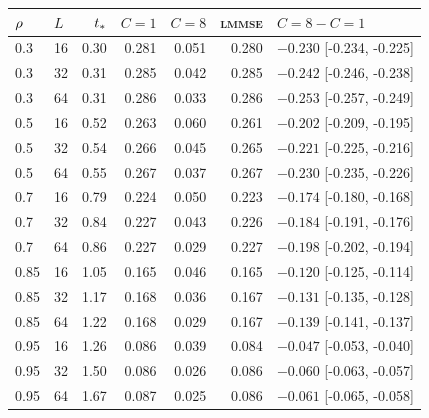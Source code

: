 \begin{tabular}{llrrrrl}
\toprule
$\rho$ & $L$ & $t_\ast$ & $C=1$ & $C=8$ & \textsc{lmmse} & $C{=}8-C{=}1$ \\
\midrule
0.3 & 16 & 0.30 & 0.281 & 0.051 & 0.280 & $-0.230$ [-0.234, -0.225] \\
0.3 & 32 & 0.31 & 0.285 & 0.042 & 0.285 & $-0.242$ [-0.246, -0.238] \\
0.3 & 64 & 0.31 & 0.286 & 0.033 & 0.286 & $-0.253$ [-0.257, -0.249] \\
0.5 & 16 & 0.52 & 0.263 & 0.060 & 0.261 & $-0.202$ [-0.209, -0.195] \\
0.5 & 32 & 0.54 & 0.266 & 0.045 & 0.265 & $-0.221$ [-0.225, -0.216] \\
0.5 & 64 & 0.55 & 0.267 & 0.037 & 0.267 & $-0.230$ [-0.235, -0.226] \\
0.7 & 16 & 0.79 & 0.224 & 0.050 & 0.223 & $-0.174$ [-0.180, -0.168] \\
0.7 & 32 & 0.84 & 0.227 & 0.043 & 0.226 & $-0.184$ [-0.191, -0.176] \\
0.7 & 64 & 0.86 & 0.227 & 0.029 & 0.227 & $-0.198$ [-0.202, -0.194] \\
0.85 & 16 & 1.05 & 0.165 & 0.046 & 0.165 & $-0.120$ [-0.125, -0.114] \\
0.85 & 32 & 1.17 & 0.168 & 0.036 & 0.167 & $-0.131$ [-0.135, -0.128] \\
0.85 & 64 & 1.22 & 0.168 & 0.029 & 0.167 & $-0.139$ [-0.141, -0.137] \\
0.95 & 16 & 1.26 & 0.086 & 0.039 & 0.084 & $-0.047$ [-0.053, -0.040] \\
0.95 & 32 & 1.50 & 0.086 & 0.026 & 0.086 & $-0.060$ [-0.063, -0.057] \\
0.95 & 64 & 1.67 & 0.087 & 0.025 & 0.086 & $-0.061$ [-0.065, -0.058] \\
\bottomrule
\end{tabular}
